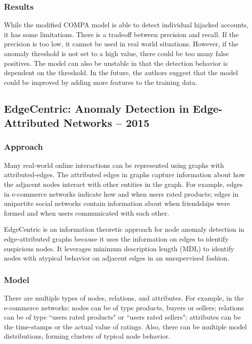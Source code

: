 \documentclass[11pt, oneside]{article}   	%
\begin{document}
\subsubsection*{Results}

\quad While the modified COMPA model is able to detect individual hijacked accounts, it has some limitations.
There is a tradeoff between precision and recall.
If the precision is too low, it cannot be used in real world situations.
However, if the anomaly threshold is not set to a high value, there could be too many false positives.
The model can also be unstable in that the detection behavior is dependent on the threshold.
In the future, the authors suggest that the model could be improved by adding more features to the training data.

\subsection*{EdgeCentric: Anomaly Detection in Edge-Attributed Networks -- 2015}

\subsubsection*{Approach}

\quad Many real-world online interactions can be represented using graphs with attributed-edges.
The attributed edges in graphs capture information about how the adjacent nodes interact with other entities in the graph.
For example, edges in e-commerce networks indicate how and when users rated products; edges in unipartite social networks contain information about when friendships were formed and when users communicated with each other.

\quad EdgeCentric is an information theoretic approach for node anomaly detection in edge-attributed graphs because it uses the information on edges to identify suspicious nodes.
It leverages minimum description length (MDL) to identify nodes with atypical behavior on adjacent edges in an unsupervised fashion. 

\subsubsection*{Model}

\quad There are multiple types of nodes, relations, and attributes.
For example, in the e-commerce networks: nodes can be of type products, buyers or sellers; relations can be of type ``users rated products" or ``users rated sellers"; attributes can be the time-stamps or the actual value of ratings.
Also, there can be multiple model distributions, forming clusters of typical node behavior.
\end{document}
